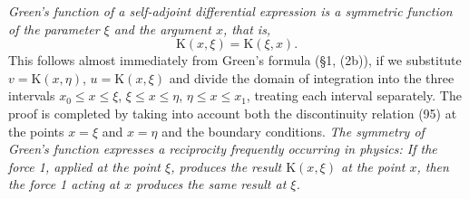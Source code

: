 \emph{Green's function of a self-adjoint differential expression is a symmetric function of the parameter $\xi$ and the argument $x$, that is,}
\[
\mathrm K(x,\xi)=\mathrm K(\xi,x).
\]
This follows almost immediately from Green's formula (\S1, (2b)), if we substitute $v=\mathrm K(x,\eta)$, $u=\mathrm K(x,\xi)$ and divide the domain of integration into the three intervals $x_0\le x\le\xi$, $\xi\le x\le\eta$, $\eta\le x\le x_1$, treating each interval separately. The proof is completed by taking into account both the discontinuity relation (95) at the points $x=\xi$ and $x=\eta$ and the boundary conditions. \emph{The symmetry of Green's function expresses a reciprocity frequently occurring in physics: If the force 1, applied at the point $\xi$, produces the result $\mathrm K(x,\xi)$ at the point $x$, then the force 1 acting at $x$ produces the same result at $\xi$.}

